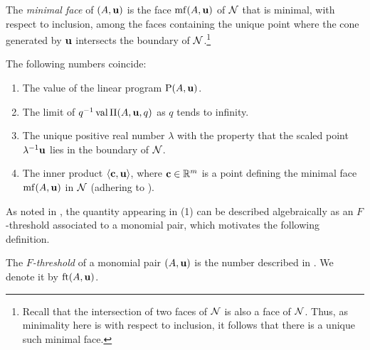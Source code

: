 \documentclass[11pt]{amsart}
\begin{document}

\begin{definition}
   The \emph{minimal face} of $(A, \mathbf{u})$ is the face $\operatorname{mf}(A, \mathbf{u})$ of $\mathcal{N}$ that is minimal, with respect to inclusion, among the faces containing the unique point where the cone generated by $\mathbf{u}$ intersects the boundary of $\mathcal{N}$.\footnote{Recall that the intersection of two faces of $\mathcal{N}$ is also a face of $\mathcal{N}$. Thus, as minimality here is with respect to inclusion, it follows that there is a unique such minimal face.}
\end{definition}

\begin{proposition}
   \label{FT descriptions: P}
   The following numbers coincide\textup:
   \begin{enumerate}
      \item\label{value} The value of the linear program $\mathrm{P}(A, \mathbf{u})$.
      \item\label{limit} The limit of $q^{-1}\operatorname{val} \Pi(A,\mathbf{u},q)$ as $q$ tends to infinity.
      \item\label{lambda} The unique positive real number $\lambda$ with the property that the scaled point $\lambda^{-1}\mathbf{u}$ lies in the boundary of $\mathcal{N}$.
      \item\label{new ip} The inner product $\langle \mathbf{c}, \mathbf{u} \rangle$, where $\mathbf{c} \in \mathbb{R}^m$ is a point defining the minimal face $\operatorname{mf}(A, \mathbf{u})$ in $\mathcal{N}$ \textup(adhering to \textup).
   \end{enumerate}
\end{proposition}

As noted in , the quantity appearing in (1) can be described algebraically as an $F$-threshold associated to a monomial pair, which motivates the following definition.

\begin{definition}
\label{FT: D}
   The \emph{$F$-threshold} of a monomial pair $(A, \mathbf{u})$ is the number described in .  We denote it by $\operatorname{ft}(A, \mathbf{u})$.
\end{definition}
\end{document}
